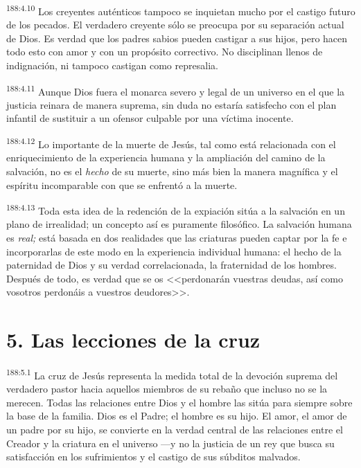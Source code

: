 \par 
\textsuperscript{188:4.10} Los creyentes auténticos tampoco se inquietan mucho por el castigo futuro de los pecados. El verdadero creyente sólo se preocupa por su separación actual de Dios. Es verdad que los padres sabios pueden castigar a sus hijos, pero hacen todo esto con amor y con un propósito correctivo. No disciplinan llenos de indignación, ni tampoco castigan como represalia.

\par 
\textsuperscript{188:4.11} Aunque Dios fuera el monarca severo y legal de un universo en el que la justicia reinara de manera suprema, sin duda no estaría satisfecho con el plan infantil de sustituir a un ofensor culpable por una víctima inocente.

\par 
\textsuperscript{188:4.12} Lo importante de la muerte de Jesús, tal como está relacionada con el enriquecimiento de la experiencia humana y la ampliación del camino de la salvación, no es el \textit{hecho} de su muerte, sino más bien la manera magnífica y el espíritu incomparable con que se enfrentó a la muerte.

\par 
\textsuperscript{188:4.13} Toda esta idea de la redención de la expiación sitúa a la salvación en un plano de irrealidad; un concepto así es puramente filosófico. La salvación humana es \textit{real;} está basada en dos realidades que las criaturas pueden captar por la fe e incorporarlas de este modo en la experiencia individual humana: el hecho de la paternidad de Dios y su verdad correlacionada, la fraternidad de los hombres. Después de todo, es verdad que se os <<perdonarán vuestras deudas, así como vosotros perdonáis a vuestros deudores>>.

\section*{5. Las lecciones de la cruz}
\par 
\textsuperscript{188:5.1} La cruz de Jesús representa la medida total de la devoción suprema del verdadero pastor hacia aquellos miembros de su rebaño que incluso no se la merecen. Todas las relaciones entre Dios y el hombre las sitúa para siempre sobre la base de la familia. Dios es el Padre; el hombre es su hijo. El amor, el amor de un padre por su hijo, se convierte en la verdad central de las relaciones entre el Creador y la criatura en el universo ---y no la justicia de un rey que busca su satisfacción en los sufrimientos y el castigo de sus súbditos malvados.

